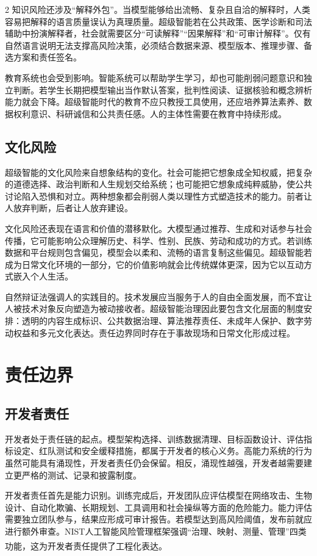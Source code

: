 \documentclass[a4paper,UTF8,zihao=5,twoside]{ctexart}
\newcommand{\upcite}[1]{\textsuperscript{\cite{#1}}}
\begin{document}
\begin{multicols}{2}
知识风险还涉及“解释外包”。当模型能够给出流畅、复杂且自洽的解释时，人类容易把解释的语言质量误认为真理质量。超级智能若在公共政策、医学诊断和司法辅助中扮演解释者，社会就需要区分“可读解释”“因果解释”和“可审计解释”。仅有自然语言说明无法支撑高风险决策，必须结合数据来源、模型版本、推理步骤、备选方案和责任签名。

教育系统也会受到影响。智能系统可以帮助学生学习，却也可能削弱问题意识和独立判断。若学生长期把模型输出当作默认答案，批判性阅读、证据核验和概念辨析能力就会下降。超级智能时代的教育不应只教授工具使用，还应培养算法素养、数据权利意识、科研诚信和公共责任感。人的主体性需要在教育中持续形成。

\subsection{文化风险}

超级智能的文化风险来自想象结构的变化。社会可能把它想象成全知权威，把复杂的道德选择、政治判断和人生规划交给系统；也可能把它想象成纯粹威胁，使公共讨论陷入恐惧和对立。两种想象都会削弱人类以理性方式塑造技术的能力。前者让人放弃判断，后者让人放弃建设。

文化风险还表现在语言和价值的潜移默化。大模型通过推荐、生成和对话参与社会传播，它可能影响公众理解历史、科学、性别、民族、劳动和成功的方式。若训练数据和平台规则包含偏见，模型会以柔和、流畅的语言复制这些偏见。超级智能若成为日常文化环境的一部分，它的价值影响就会比传统媒体更深，因为它以互动方式嵌入个人生活。

自然辩证法强调人的实践目的。技术发展应当服务于人的自由全面发展，而不宜让人被技术对象反向塑造为被动接收者。超级智能治理因此要包含文化层面的制度安排：透明的内容生成标识、公共数据治理、算法推荐责任、未成年人保护、数字劳动权益和多元文化表达。责任边界同时存在于事故现场和日常文化形成过程。

\section{责任边界}

\subsection{开发者责任}

开发者处于责任链的起点。模型架构选择、训练数据清理、目标函数设计、评估指标设定、红队测试和安全缓释措施，都属于开发者的核心义务。高能力系统的行为虽然可能具有涌现性，开发者责任仍会保留。相反，涌现性越强，开发者越需要建立更严格的测试、记录和披露制度。

开发者责任首先是能力识别。训练完成后，开发团队应评估模型在网络攻击、生物设计、自动化欺骗、长期规划、工具调用和社会操纵等方面的危险能力。能力评估需要独立团队参与，结果应形成可审计报告。若模型达到高风险阈值，发布前就应进行额外审查。NIST人工智能风险管理框架强调“治理、映射、测量、管理”四类功能\upcite{nist2023}，这为开发者责任提供了工程化表达。


\end{multicols}
\end{document}
